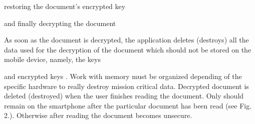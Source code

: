 \documentclass{bjmc}
\begin{document}
restoring the document's  encrypted key 

and finally decrypting the document 


As soon as the document is decrypted, the application deletes (destroys) all the data used for the decryption of the document  which should not be stored on the mobile device, namely, 
the keys 

 and  encrypted keys . 
Work with memory must be organized depending of the specific hardware to really destroy mission critical data.
Decrypted document   is deleted (destroyed) when the user finishes reading 
the document. Only  should remain on the smartphone 
after the particular document has been read  (see Fig. 2.). Otherwise after reading the document becomes unsecure.


\unitlength 1.00mm
\linethickness{0.4pt}
\end{document}
